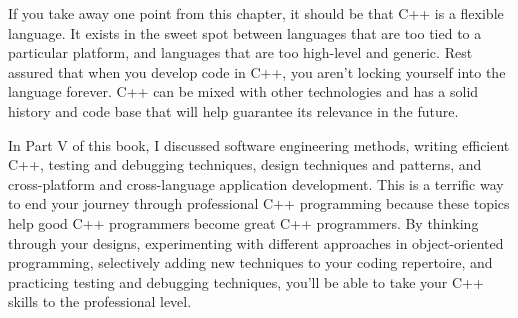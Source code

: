 If you take away one point from this chapter, it should be that C++ is a flexible language. It exists in the sweet spot between languages that are too tied to a particular platform, and languages that are too high-level and generic. Rest assured that when you develop code in C++, you aren’t locking yourself into the language forever. C++ can be mixed with other technologies and has a solid history and code base that will help guarantee its relevance in the future.

In Part V of this book, I discussed software engineering methods, writing efficient C++, testing and debugging techniques, design techniques and patterns, and cross-platform and cross-language application development. This is a terrific way to end your journey through professional C++ programming because these topics help good C++ programmers become great C++ programmers. By thinking through your designs, experimenting with different approaches in object-oriented programming, selectively adding new techniques to your coding repertoire, and practicing testing and debugging techniques, you’ll be able to take your C++ skills to the professional level.

